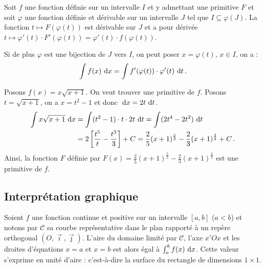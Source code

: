 	      \begin{thm}
	      Soit $f$ une fonction d\'efinie sur un intervalle $I$ et y admettant une primitive $F$ 
	      et soit $\varphi$ une fonction d\'efinie et d\'erivable sur un intervalle $J$ tel que $I \subseteq \varphi (J)$.
	      La fonction $t \mapsto F\left( \varphi (t) \right)$ est d\'erivable sur $J$ et a pour d\'eriv\'ee 
	      $t \mapsto \varphi'(t) \cdot F' \left( \varphi (t) \right)  = \varphi'(t) \cdot f\left(\varphi (t) \right) $.
	      
	      Si de plus $\varphi$ est une bijection de $J$ vers $I$, on peut poser $x=\varphi (t)$, $x\in I$, on a :
	            \begin{equation*}
	                  \int f(x) ~\mathrm{d}x = \int f'(\varphi(t)) \cdot \varphi'(t) ~\mathrm{d}t      \,.
	            \label{eq:changement de variable primitive}
	            \end{equation*}
	            \begin{ex}
	                  Posons $f(x) = x \sqrt{x+1}$.
	                  On veut trouver une primitive de $f$.
	                  Posons $t = \sqrt{x+1}$, on a $x = t^2 - 1$ et donc $~\mathrm{d}x = 2t ~\mathrm{d}t$.
	                  \begin{align*}
	                        \int x \sqrt{x+1} ~\mathrm{d}x & = \int (t^2 - 1) \cdot t \cdot 2t ~\mathrm{d}t                                     
	                                                = \int (2t^4 - 2t^2) ~\mathrm{d}t                                                  \\
	                                              & = 2 \left[ \frac{t^5}{t} - \frac{t^3}{3} \right] + C                      
	                                                = \frac{2}{5} (x+1)^{\frac{5}{2}} - \frac{2}{3} (x+1)^{\frac{3}{2}} + C   \,.
	                  \end{align*}
	                  Ainsi, la fonction $F$ d\'efinie par 
	                  $F(x) = \frac{2}{5} (x+1)^{\frac{5}{2}} - \frac{2}{3} (x+1)^{\frac{3}{2}}$
	                  est une primitive de $f$.
	            \end{ex}
	      \end{thm}
      \subsection{Interpr\'etation graphique}
      Soient $f$ une fonction continue et positive sur un intervalle $[a,b]$ ($a<b$)
      et notons par $\mathscr{C}$ sa courbe repr\'esentative dans 
      le plan rapport\'e \`a un rep\`ere orthogonal $(O,\vec{\imath},\vec{\jmath})$.
      L'aire du domaine limit\'e par $\mathscr{C}$, l'axe $x'Ox$ et les droites d'\'equations $x=a$ et $x=b$
      est alors \'egal \`a {$\int_{a}^{b} f(x) ~\mathrm{d}x$}.
      Cette valeur s'exprime en unit\'e d'aire : c'est-\`a-dire la surface du rectangle de dimensions $1\times1$.

